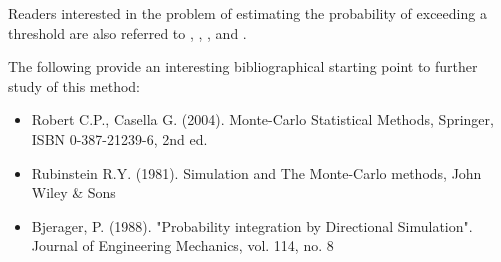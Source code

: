 {
  Readers interested in the problem of estimating the probability of exceeding a threshold are also referred to , , ,  and .

  The following provide an interesting bibliographical starting point to further study of this method:
  \begin{itemize}
  \item Robert C.P., Casella G. (2004). Monte-Carlo Statistical Methods, Springer, ISBN 0-387-21239-6, 2nd ed.
  \item Rubinstein R.Y. (1981). Simulation and The Monte-Carlo methods, John Wiley \& Sons
  \item Bjerager, P. (1988). "Probability integration by Directional Simulation". Journal of Engineering Mechanics, vol. 114, no. 8
  \end{itemize}
}
